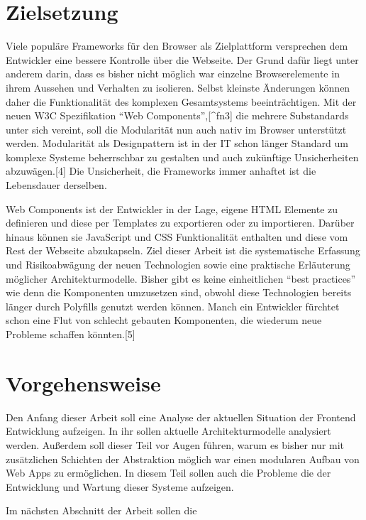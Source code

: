 \section{Zielsetzung}\label{zielsetzung}

Viele populäre Frameworks für den Browser als Zielplattform versprechen
dem Entwickler eine bessere Kontrolle über die Webseite. Der Grund dafür
liegt unter anderem darin, dass es bisher nicht möglich war einzelne
Browserelemente in ihrem Aussehen und Verhalten zu isolieren. Selbst
kleinste Änderungen können daher die Funktionalität des komplexen
Gesamtsystems beeinträchtigen. Mit der neuen W3C Spezifikation ``Web
Components'',{[}\^{}fn3{]} die mehrere Substandards unter sich vereint,
soll die Modularität nun auch nativ im Browser unterstützt werden.
Modularität als Designpattern ist in der IT schon länger Standard um
komplexe Systeme beherrschbar zu gestalten und auch zukünftige
Unsicherheiten abzuwägen.{[}4{]} Die Unsicherheit, die Frameworks immer
anhaftet ist die Lebensdauer derselben.

Web Components ist der Entwickler in der Lage, eigene HTML Elemente zu
definieren und diese per Templates zu exportieren oder zu importieren.
Darüber hinaus können sie JavaScript und CSS Funktionalität enthalten
und diese vom Rest der Webseite abzukapseln. Ziel dieser Arbeit ist die
systematische Erfassung und Risikoabwägung der neuen Technologien sowie
eine praktische Erläuterung möglicher Architekturmodelle. Bisher gibt es
keine einheitlichen ``best practices'' wie denn die Komponenten
umzusetzen sind, obwohl diese Technologien bereits länger durch
Polyfills genutzt werden können. Manch ein Entwickler fürchtet schon
eine Flut von schlecht gebauten Komponenten, die wiederum neue Probleme
schaffen könnten.{[}5{]}

\section{Vorgehensweise}\label{vorgehensweise}

Den Anfang dieser Arbeit soll eine Analyse der aktuellen Situation der
Frontend Entwicklung aufzeigen. In ihr sollen aktuelle
Architekturmodelle analysiert werden. Außerdem soll dieser Teil vor
Augen führen, warum es bisher nur mit zusätzlichen Schichten der
Abstraktion möglich war einen modularen Aufbau von Web Apps zu
ermöglichen. In diesem Teil sollen auch die Probleme die der Entwicklung
und Wartung dieser Systeme aufzeigen.

Im nächsten Abschnitt der Arbeit sollen die

